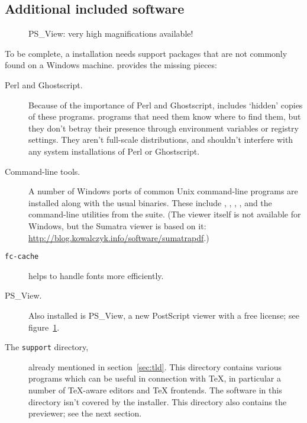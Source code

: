 \documentclass{article}
\begin{document}
\subsection{Additional included software}

\begin{figure}[tb]
\caption{PS\_View: very high magnifications available!}\label{fig:psview}
\end{figure}

To be complete, a \TL installation needs support packages that are not
commonly found on a Windows machine. \TL{} provides the missing
pieces:
\begin{description}
\item[Perl and Ghostscript.] Because of the importance of Perl and
  Ghostscript, \TL{} includes `hidden' copies of these
  programs. \TL{} programs that need them know where to find them,
  but they don't betray their presence through environment variables
  or registry settings. They aren't full-scale distributions, and
  shouldn't interfere with any system installations of Perl or
  Ghostscript.
\item[Command-line tools.] A number of Windows ports of common Unix
  command-line programs are installed along with the usual \TL{}
  binaries. These include , ,
  , ,  and the
  command-line utilities from the  suite.  (The
   viewer itself is not available for Windows, but the
  Sumatra  viewer is based on it:
  \url{http://blog.kowalczyk.info/software/sumatrapdf}.)
\item[\texttt{fc-cache}] helps \XeTeX{} to handle fonts more
  efficiently.
\item[PS\_View.] Also installed is PS\_View, a new PostScript viewer
  with a free license; see figure~\ref{fig:psview}.
\end{description}
\begin{description}
\item[The \texttt{support} directory,] already mentioned in
  section~\ref{sec:tld}. This directory contains various programs
  which can be useful in connection with \TeX, in particular a
  number of \TeX-aware editors and \TeX{} frontends. The software in
  this directory isn't covered by the installer. This directory also
  contains the  \dvi{} previewer; see the next section.
\end{description}
\end{document}
